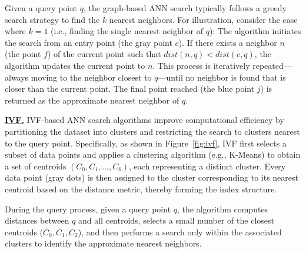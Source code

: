 \documentclass[sigconf, nonacm]{acmart}
\begin{document}
\begin{sloppypar}
Given a query point $q$, the graph-based ANN search typically follows a greedy search strategy to find the $k$ nearest neighbors. For illustration, consider the case where $k = 1$ (i.e., finding the single nearest neighbor of $q$): The algorithm initiates the search from an entry point (the gray point $c$). If there exists a neighbor $n$ (the point $f$) of the current point such that $\textit{dist}(n, q) < \textit{dist}(c, q)$, the algorithm updates the current point to $n$. This process is iteratively repeated—always moving to the neighbor closest to $q$—until no neighbor is found that is closer than the current point. The final point reached (the blue point $j$) is returned as the approximate nearest neighbor of $q$.

\vspace{1em}
\noindent\textbf{\underline{IVF.}}
IVF-based ANN search algorithms improve computational efficiency by partitioning the dataset into clusters and restricting the search to clusters nearest to the query point. Specifically, as shown in Figure~\ref{fig:ivf}, IVF first selects a subset of data points and applies a clustering algorithm (e.g., K-Means) to obtain a set of centroids $(C_0, C_1, ..., C_6)$, each representing a distinct cluster. Every data point (gray dots) is then assigned to the cluster corresponding to its nearest centroid based on the distance metric, thereby forming the index structure.

During the query process, given a query point $q$, the algorithm computes distances between $q$ and all centroids, selects a small number of the closest centroids ($C_0, C_1, C_2$), and then performs a search only within the associated clusters to identify the approximate nearest neighbors.


\end{sloppypar}
\end{document}
